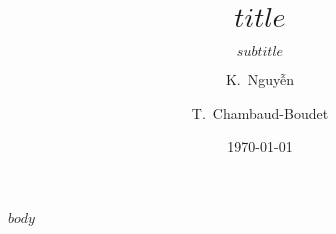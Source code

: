 \documentclass[
$if(handout)$
handout,
$endif$
]{beamer}
\date{\today}
\author{K.~Nguyễn \and T.~Chambaud-Boudet}
\institute{King's College, The British School of Madrid}
\title{$title$}
\subtitle{$subtitle$}
\begin{document}
\maketitle

$body$
\end{document}

